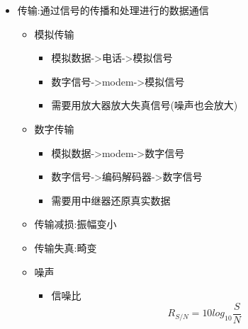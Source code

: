 \documentclass[a4paper,12pt,notitlepage]{article}
\begin{document}
\begin{itemize}
	\item 传输:通过信号的传播和处理进行的数据通信
	\begin{itemize}
		\item 模拟传输
		\begin{itemize}
			\item 模拟数据->电话->模拟信号
			\item 数字信号->modem->模拟信号
			\item 需要用放大器放大失真信号(噪声也会放大)
		\end{itemize}
		\item 数字传输
		\begin{itemize}
			\item 模拟数据->modem->数字信号
			\item 数字信号->编码解码器->数字信号
			\item 需要用中继器还原真实数据
		\end{itemize}
		\item 传输减损:振幅变小
		\item 传输失真:畸变
		\item 噪声
		\begin{itemize}
			\item 信噪比
			\begin{equation}
				R_{S/N}=10log_{10}\frac{S}{N}
			\end{equation}
		\end{itemize}
	\end{itemize}
\end{itemize}
\end{document}
